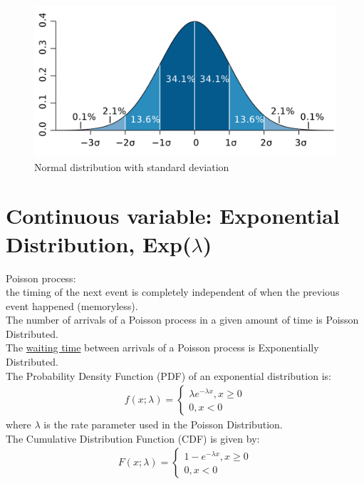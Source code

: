 \begin{figure}[h!]
\begin{center}
	\includegraphics[scale=0.08]{normal_sd.png}
	\caption[]{Normal distribution with standard deviation}
	\label{fairdiepmf}
	\end{center}
	\end{figure}
	

\section{Continuous variable: Exponential Distribution, Exp($\lambda$)}

Poisson process:\\
the timing of the next event is completely independent of when the previous event happened (memoryless).\\
The number of arrivals of a Poisson process in a given amount of time is Poisson Distributed. \\
The \underline{waiting time} between arrivals of a Poisson process is Exponentially Distributed. \\

The Probability Density Function (PDF) of an exponential distribution is:
\begin{eqnarray}
f(x;\lambda) = \begin{cases}
\lambda e^{-\lambda x},             x \geq 0\\
0,      x < 0
\end{cases}
\end{eqnarray}
where $\lambda$ is the rate parameter used in the Poisson Distribution. \\

The Cumulative Distribution Function (CDF) is given by:
\begin{eqnarray}
F(x;\lambda) = \begin{cases}
1 - e^{-\lambda x},             x \geq 0\\
0,      x < 0
\end{cases}
\end{eqnarray}

